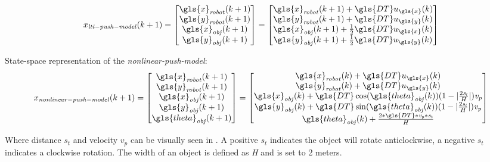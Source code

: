 \begin{equation}
x_{\mathit{lti-push-model}}(k+1)=
\begin{bmatrix}
\gls{x}_{\mathit{robot}}(k+1)\\
\gls{y}_{\mathit{robot}}(k+1)\\
\gls{x}_{\mathit{obj}}(k+1)\\
\gls{y}_{\mathit{obj}}(k+1)
\end{bmatrix}
=
\begin{bmatrix}
\gls{x}_{\mathit{robot}}(k+1) + \gls{DT} u_{\gls{x}}(k)\\
\gls{y}_{\mathit{robot}}(k+1) + \gls{DT} u_{\gls{y}}(k)\\
\gls{x}_{\mathit{obj}}(k+1) + \frac{1}{2} \gls{DT} u_{\gls{x}}(k)\\
\gls{y}_{\mathit{obj}}(k+1) + \frac{1}{2} \gls{DT} u_{\gls{y}}(k)
\end{bmatrix}
\label{eq:lti-push-model}
\end{equation}


State-space representation of the \textit{nonlinear-push-model}:\bs
\begin{equation}
x_{\mathit{nonlinear-push-model}}(k+1)=
\begin{bmatrix}
\gls{x}_{\mathit{robot}}(k+1)\\
\gls{y}_{\mathit{robot}}(k+1)\\
\gls{x}_{\mathit{obj}}(k+1)\\
\gls{y}_{\mathit{obj}}(k+1)\\
\gls{theta}_{\mathit{obj}}(k+1)
\end{bmatrix}
=
\begin{bmatrix}
\gls{x}_{\mathit{robot}}(k) + \gls{DT} u_{\gls{x}}(k)\\
\gls{y}_{\mathit{robot}}(k) + \gls{DT} u_{\gls{y}}(k)\\
\gls{x}_{\mathit{obj}}(k) + \gls{DT}\cos(\gls{theta}_{\mathit{obj}}(k)) (1-|\frac{2\mathit{s_t}}{H}|)\mathit{v_p}\\
\gls{y}_{\mathit{obj}}(k) + \gls{DT}\sin(\gls{theta}_{\mathit{obj}}(k)) (1-|\frac{2\mathit{s_t}}{H}|)\mathit{v_p}\\
\gls{theta}_{\mathit{obj}}(k) + \frac{2*\gls{DT}*\mathit{v_p}*\mathit{s_t}}{H}
\end{bmatrix}
\label{eq:nonlinear-push-model}
\end{equation}


Where distance $s_t$ and velocity $v_p$ can be visually seen in . A positive $s_t$ indicates the object will rotate anticlockwise, a negative $s_t$ indicates a clockwise rotation. The width of an object is defined as \textit{H} and is set to 2 meters.\bs

